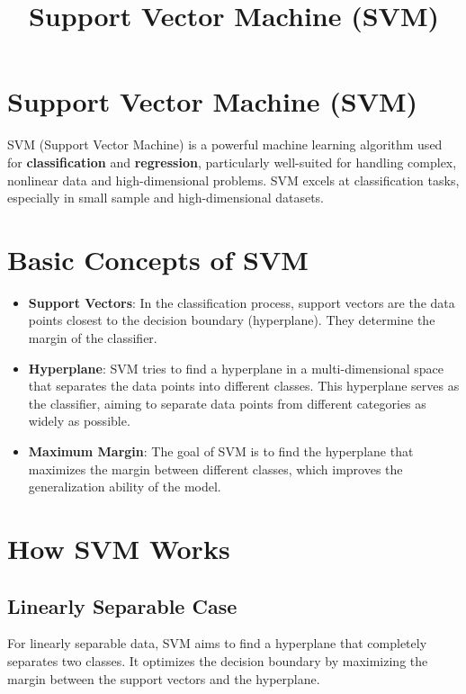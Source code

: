 \documentclass{article}
\title{Support Vector Machine (SVM)}
\author{}
\date{}
\begin{document}
	
	\maketitle
	
	\section{Support Vector Machine (SVM)}
	
	SVM (Support Vector Machine) is a powerful machine learning algorithm used for \textbf{classification} and \textbf{regression}, particularly well-suited for handling complex, nonlinear data and high-dimensional problems. SVM excels at classification tasks, especially in small sample and high-dimensional datasets.
	
	\section{Basic Concepts of SVM}
	
	\begin{itemize}
		\item \textbf{Support Vectors}: In the classification process, support vectors are the data points closest to the decision boundary (hyperplane). They determine the margin of the classifier.
		\item \textbf{Hyperplane}: SVM tries to find a hyperplane in a multi-dimensional space that separates the data points into different classes. This hyperplane serves as the classifier, aiming to separate data points from different categories as widely as possible.
		\item \textbf{Maximum Margin}: The goal of SVM is to find the hyperplane that maximizes the margin between different classes, which improves the generalization ability of the model.
	\end{itemize}
	
	\section{How SVM Works}
	
	\subsection{Linearly Separable Case}
	For linearly separable data, SVM aims to find a hyperplane that completely separates two classes. It optimizes the decision boundary by maximizing the margin between the support vectors and the hyperplane.
	
\end{document}
